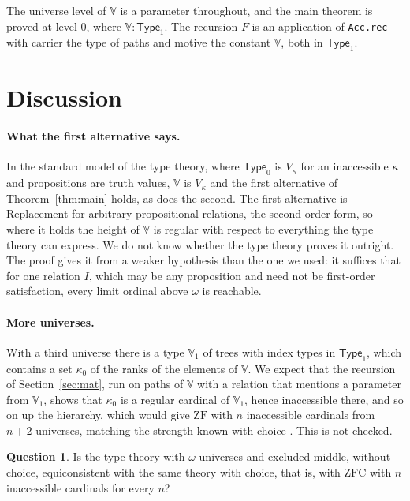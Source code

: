 \documentclass[10pt]{article}
\theoremstyle{definition}
\newtheorem{question}[theorem]{Question}
\theoremstyle{remark}
\newcommand{\Type}{\mathsf{Type}}
\newcommand{\ZF}{\mathrm{ZF}}
\newcommand{\ZFC}{\mathrm{ZFC}}
\newcommand{\V}{\mathbb{V}}
\newcommand{\lean}[1]{\texttt{#1}}
\begin{document}
The universe level of $\V$ is a parameter throughout, and the main
theorem is proved at level $0$, where $\V:\Type_1$. The recursion $F$ is
an application of \lean{Acc.rec} with carrier the type of paths and
motive the constant $\V$, both in $\Type_1$.

\section{Discussion}\label{sec:discussion}

\paragraph{What the first alternative says.}
In the standard model of the type theory, where $\Type_0$ is
$V_\kappa$ for an inaccessible $\kappa$ and propositions are truth values,
$\V$ is $V_\kappa$ and the first alternative of
Theorem~\ref{thm:main} holds, as does the second. The first alternative
is Replacement for arbitrary propositional relations, the second-order
form, so where it holds the height of $\V$ is regular with respect to
everything the type theory can express. We do not know whether the type
theory proves it outright. The proof gives it from a weaker
hypothesis than the one we used: it suffices that for one relation $I$,
which may be any proposition and need not be first-order satisfaction,
every limit ordinal above $\omega$ is reachable.

\paragraph{More universes.}
With a third universe there is a type $\V_1$ of trees with index types
in $\Type_1$, which contains a set $\kappa_0$ of the ranks of the elements
of $\V$. We expect that the recursion of Section~\ref{sec:mat}, run on
paths of $\V$ with a relation that mentions a parameter from $\V_1$,
shows that $\kappa_0$ is a regular cardinal of $\V_1$, hence inaccessible
there, and so on up the hierarchy, which would give $\ZF$ with $n$
inaccessible cardinals from $n+2$ universes, matching the strength known
with choice \cite{werner97,carneiro19}. This is not checked.

\begin{question}
Is the type theory with $\omega$ universes and excluded middle, without
choice, equiconsistent with the same theory with choice, that is, with
$\ZFC$ with $n$ inaccessible cardinals for every $n$?
\end{question}
\end{document}
